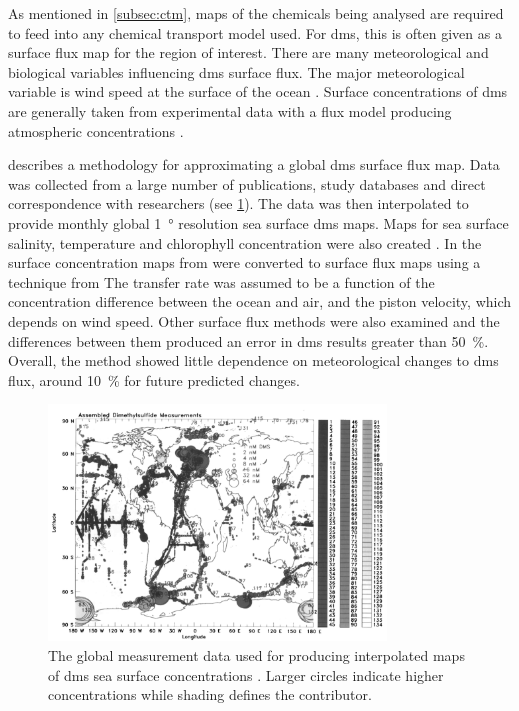 	As mentioned in \cref{subsec:ctm}, maps of the chemicals being analysed are required to feed into any chemical transport model used. For \gls{dms}, this is often given as a surface flux map for the region of interest. There are many meteorological and biological variables influencing \gls{dms} surface flux. The major meteorological variable is wind speed at the surface of the ocean \citep{Kettle:2000jy}. Surface concentrations of \gls{dms} are generally taken from experimental data with a flux model producing atmospheric concentrations \citep{woodhouse:2010ed}.

	\citet{Kettle:2000jy} describes a methodology for approximating a global \gls{dms} surface flux map. Data was collected from a large number of publications, study databases and direct correspondence with researchers (see \cref{fig:kettledata}). The data was then interpolated to provide monthly global \SI{1}{\degree} resolution sea surface \gls{dms} maps. Maps for sea surface salinity, temperature and chlorophyll concentration were also created \citep{kettle1999global}. In \citet{Kettle:2000jy} the surface concentration maps from \citet{kettle1999global} were converted to surface flux maps using a technique from \citet{liss:1983iu} The transfer rate was assumed to be a function of the concentration difference between the ocean and air, and the piston velocity, which depends on wind speed. Other surface flux methods were also examined and the differences between them produced an error in \gls{dms} results greater than \SI{50}{\percent}. Overall, the method showed little dependence on meteorological changes to \gls{dms} flux, around \SI{10}{\percent} for future predicted changes.

	\begin{figure}[!htb]
	    \centering
	    \includegraphics[width=0.8\textwidth,natwidth=1414,natheight=1344]{Fig/kettledata.png}
	    \caption{The global measurement data used for producing interpolated maps of \gls{dms} sea surface concentrations \citep{kettle1999global}. Larger circles indicate higher concentrations while shading defines the contributor.}
	    \label{fig:kettledata}
	\end{figure}

